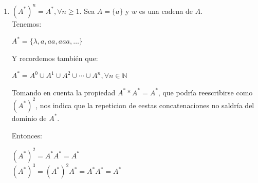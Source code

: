 \begin{enumerate}
        Por tanto podemos notar que de la misma manera seguiremos contando con la cadena vacía $\lambda$. Además al momento de agregar una nueva cadena, ésta seguirá perteneciendo a $A$ y podría seguir siendo la misma.
        
        Si tenemos:
        \begin{center}
            $aaa * aa = aaaaa$,\\ donde\\ $aaa,aa,aaaaa \in A^*$
        \end{center}
        
        También podemos visualizar que la cadena no tendría cambios si alguna de las dos --o las dos-- cuenta con cadena vacía:
        \begin{center}
            $w * \lambda = w$\\
            $\lambda * w = w$\\
            $\lambda * \lambda = \lambda$
        \end{center}
        
        Por lo tanto:
        \begin{center}
            $\boxed{A^* = A^* * A^*}$
        \end{center}
    \item $(A^*)^n = A^*, \forall n \geq 1$.
        \subitem Sea $A = \{a\}$ y $w$ es una cadena de $A$.\\
        
        Tenemos:
        \begin{center}
            $A^* = \{\lambda, a, aa, aaa, \ldots\}$
        \end{center}
        
        Y recordemos también que:
        \begin{center}
            $A^* = A^0 \cup A^1 \cup A^2 \cup \dotsm \cup A^n, \forall n \in \mathbb{N}$
        \end{center}
        
        Tomando en cuenta la propiedad $A^* * A^* = A^*$, que podría reescribirse como $(A^*)^2$, nos indica que la repeticion de eestas concatenaciones no saldría del dominio de $A^*$.
        
        Entonces:
        \begin{center}
            $(A^*)^2 = A^*A^* = A^*$\\
            $(A^*)^3 = (A^*)^2A^* = A^*A^* = A^*$
        \end{center}
        

\end{enumerate}
